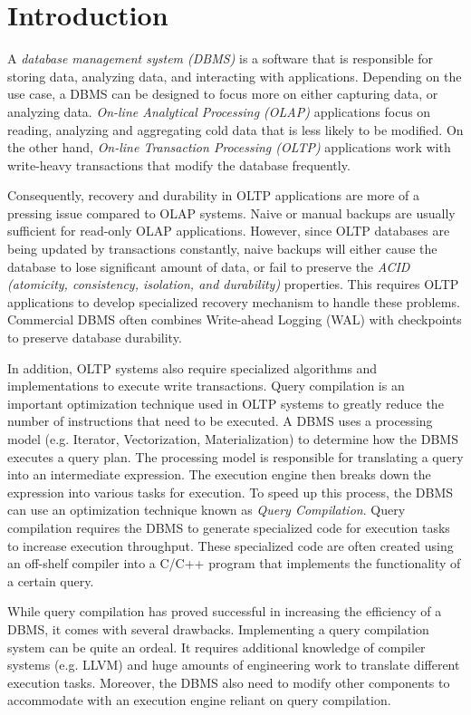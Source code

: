 \documentclass[12pt]{cmuthesis}
\begin{document}
\chapter{Introduction}
A \textit{database management system (DBMS)} is a software that is responsible for storing data, analyzing data, and interacting with applications. Depending on the use case, a DBMS can be designed to focus more on either capturing data, or analyzing data. \textit{On-line Analytical Processing (OLAP)} applications focus on reading, analyzing and aggregating cold data that is less likely to be modified. On the other hand, \textit{On-line Transaction Processing (OLTP)} applications work with write-heavy transactions that modify the database frequently.

Consequently, recovery and durability in OLTP applications are more of a pressing issue compared to OLAP systems. Naive or manual backups are usually sufficient for read-only OLAP applications. However, since OLTP databases are being updated by transactions constantly, naive backups will either cause the database to lose significant amount of data, or fail to preserve the \textit{ACID (atomicity, consistency, isolation, and durability)} properties. This requires OLTP applications to develop specialized recovery mechanism to handle these problems. Commercial DBMS often combines Write-ahead Logging (WAL) with checkpoints to preserve database durability.

In addition, OLTP systems also require specialized algorithms and implementations to execute write transactions. Query compilation is an important optimization technique used in OLTP systems to greatly reduce the number of instructions that need to be executed. A DBMS uses a processing model (e.g. Iterator, Vectorization, Materialization) to determine how the DBMS executes a query plan. The processing model is responsible for translating a query into an intermediate expression. The execution engine then breaks down the expression into various tasks for execution. To speed up this process, the DBMS can use an optimization technique known as \textit{Query Compilation}. Query compilation requires the DBMS to generate specialized code for execution tasks to increase execution throughput. These specialized code are often created using an off-shelf compiler into a C/C++ program that implements the functionality of a certain query.

While query compilation has proved successful in increasing the efficiency of a DBMS, it comes with several drawbacks. Implementing a query compilation system can be quite an ordeal. It requires additional knowledge of compiler systems (e.g. LLVM) and huge amounts of engineering work to translate different execution tasks. Moreover, the DBMS also need to modify other components to accommodate with an execution engine reliant on query compilation.
\end{document}
